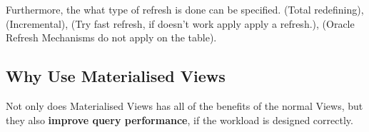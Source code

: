 \documentclass[11pt,a4paper,twocolumn]{book}
\begin{document}
Furthermore, the what type of refresh is done can be specified.  (Total redefining),  (Incremental),  (Try fast refresh, if doesn't work apply apply a  refresh.),  (Oracle Refresh Mechanisms do not apply on the table).

\subsection{Why Use Materialised Views}

Not only does Materialised Views has all of the benefits of the normal Views, but they also \textbf{improve query performance}, if the workload is designed correctly.
\end{document}
